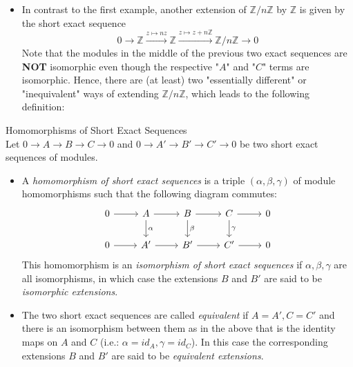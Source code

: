 \begin{itemize}
    \noindent Let $\{n_j \}_{j \in J}$ be such that it generates $\ker \varphi$, which give the "relations" on $m_j$'s. Similarly, $n_j$'s correspond a homomorphism $\psi: \oplus_{j \in J}R \to \oplus _{i \in I} R_i$, sending the $j$th $1$ to $n_j$.

    \noindent Now we see that: $M$ is described as the module with generators $\{m_i \}_{i \in I}$ and relations $\{n_j\}_{j \in J}$ iff the sequence
    $$\oplus_{j \in J} R \overset{\psi}{\to} \oplus_{i \in I} R \overset{\varphi}{\to} M \to 0$$
    is exact. This example leads to a definition for presentation of modules but we will first introduce the main content and then introduce this concept at the end of this "subsubsection". For convenience, let's give this example a name, say "the presentation of modules".

    \item In contrast to the first example, another extension of $\mathbb{Z}/n\mathbb{Z}$ by $\mathbb{Z}$ is given by the short exact sequence
    $$0 \to \mathbb{Z} \overset{z \mapsto nz}{\longrightarrow} \mathbb{Z} \overset{z \mapsto z+n \mathbb{Z}}{\longrightarrow} \mathbb{Z}/n\mathbb{Z} \to 0$$
    Note that the modules in the middle of the previous two exact sequences are \textbf{NOT} isomorphic even though the respective "$A$" and "$C$" terms are isomorphic. Hence, there are (at least) two "essentially different" or "inequivalent" ways of extending $\mathbb{Z}/n\mathbb{Z}$, which leads to the following definition:
\end{itemize}

\begin{definition}{Homomorphisms of Short Exact Sequences}\\
Let $0 \to A\to B\to C\to 0$ and $0 \to A' \to B' \to C'\to 0$ be two short exact sequences of modules.
\begin{itemize}
    \item A \textit{homomorphism of short exact sequences} is a triple $(\alpha, \beta, \gamma)$ of module homomorphisms such that the following diagram commutes:
    \[
    \begin{tikzcd}
    0 \arrow[r] & A \arrow[r] \arrow[d, "\alpha"] & B \arrow[r] \arrow[d, "\beta"] & C \arrow[r] \arrow[d, "\gamma"] & 0 \\
    0 \arrow[r] & A' \arrow[r]                    & B' \arrow[r]                   & C' \arrow[r]                    & 0
    \end{tikzcd}
    \]
    This homomorphism is an \textit{isomorphism of short exact sequences} if $\alpha,\beta,\gamma$ are all isomorphisms, in which case the extensions $B$ and $B'$ are said to be \textit{isomorphic extensions}.

    \item The two short exact sequences are called \textit{equivalent} if $A=A',C=C'$ and there is an isomorphism between them as in the above that is the identity maps on $A$ and $C$ (i.e.: $\alpha=id_A,\gamma=id_C$). In this case the corresponding extensions $B$ and $B'$ are said to be \textit{equivalent extensions}.
\end{itemize}
\end{definition}

